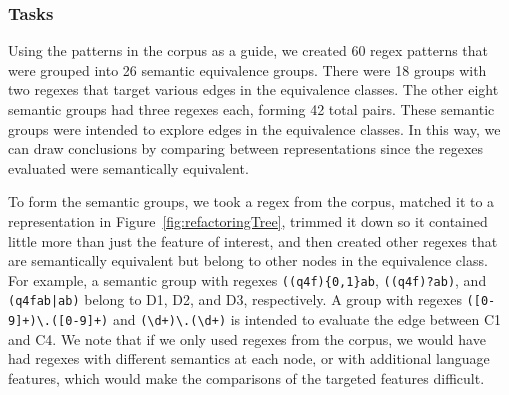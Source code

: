 \subsubsection{Tasks}
Using the patterns in the corpus as a guide, we created 60 regex patterns that were grouped into 26 semantic equivalence groups.
 There were 18 groups with two regexes that target various edges in the equivalence classes.
The other eight semantic groups had three regexes each, forming 42 total pairs.
These semantic groups were intended to explore edges in the equivalence classes. In this way, we can draw conclusions by comparing between representations since the regexes evaluated were semantically equivalent.

To form the semantic groups, we took a regex from the corpus, matched it to a representation in Figure~\ref{fig:refactoringTree}, trimmed it down so it contained little more than just the feature of interest, and then created other regexes that are semantically equivalent but belong to other nodes in the equivalence class. For example, a semantic group with regexes \verb!((q4f){0,1}ab!, \verb!((q4f)?ab)!, and \verb!(q4fab|ab)! belong to D1, D2, and D3, respectively.
A  group with regexes \verb!([0-9]+)\.([0-9]+)! and  \verb!(\d+)\.(\d+)! is intended to evaluate the edge between C1 and C4.
We note that if we only used regexes from the corpus, we would have had regexes with different semantics at each node, or with additional language features, which would make the comparisons of the targeted features  difficult.




%





